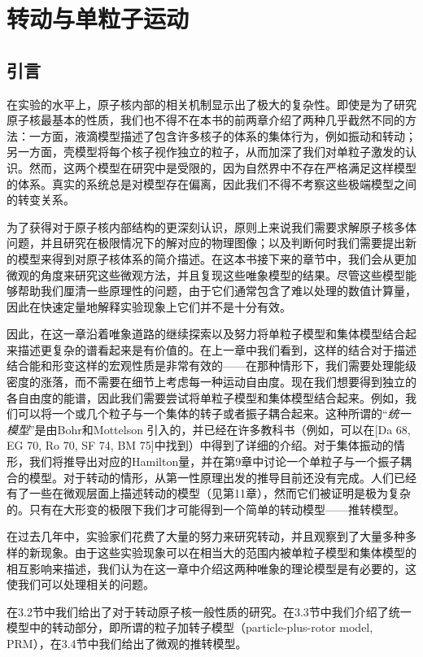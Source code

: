 
\chapter{转动与单粒子运动}

\section{引言}

在实验的水平上，原子核内部的相关机制显示出了极大的复杂性。即使是为了研究原子核最基本的性质，我们也不得不在本书的前两章介绍了两种几乎截然不同的方法：一方面，液滴模型描述了包含许多核子的体系的集体行为，例如振动和转动；另一方面，壳模型将每个核子视作独立的粒子，从而加深了我们对单粒子激发的认识。然而，这两个模型在研究中是受限的，因为自然界中不存在严格满足这样模型的体系。真实的系统总是对模型存在偏离，因此我们不得不考察这些极端模型之间的转变关系。

为了获得对于原子核内部结构的更深刻认识，原则上来说我们需要求解原子核多体问题，并且研究在极限情况下的解对应的物理图像；以及判断何时我们需要提出新的模型来得到对原子核体系的简介描述。在这本书接下来的章节中，我们会从更加微观的角度来研究这些微观方法，并且复现这些唯象模型的结果。尽管这些模型能够帮助我们厘清一些原理性的问题，由于它们通常包含了难以处理的数值计算量，因此在快速定量地解释实验现象上它们并不是十分有效。

因此，在这一章沿着唯象道路的继续探索以及努力将单粒子模型和集体模型结合起来描述更复杂的谱看起来是有价值的。在上一章中我们看到，这样的结合对于描述结合能和形变这样的宏观性质是非常有效的——在那种情形下，我们需要处理能级密度的涨落，而不需要在细节上考虑每一种运动自由度。现在我们想要得到独立的各自由度的能谱，因此我们需要尝试将单粒子模型和集体模型结合起来。例如，我们可以将一个或几个粒子与一个集体的转子或者振子耦合起来。这种所谓的“\emph{统一模型}”是由Bohr和Mottelson
\cite{Bo52,BM53}引入的，并已经在许多教科书（例如，可以在{[}Da 68, EG 70, Ro 70, SF 74,
BM 75{]}中找到）中得到了详细的介绍。对于集体振动的情形，我们将推导出对应的Hamilton量，并在第9章中讨论一个单粒子与一个振子耦合的模型。对于转动的情形，从第一性原理出发的推导目前还没有完成。人们已经有了一些在微观层面上描述转动的模型（见第11章），然而它们被证明是极为复杂的。只有在大形变的极限下我们才可能得到一个简单的转动模型——推转模型。

在过去几年中，实验家们花费了大量的努力来研究转动，并且观察到了大量多种多样的新现象。由于这些实验现象可以在相当大的范围内被单粒子模型和集体模型的相互影响来描述，我们认为在这一章中介绍这两种唯象的理论模型是有必要的，这使我们可以处理相关的问题。

在3.2节中我们给出了对于转动原子核一般性质的研究。在3.3节中我们介绍了统一模型中的转动部分，即所谓的粒子加转子模型（particle-plus-rotor
model, PRM），在3.4节中我们给出了微观的推转模型。

